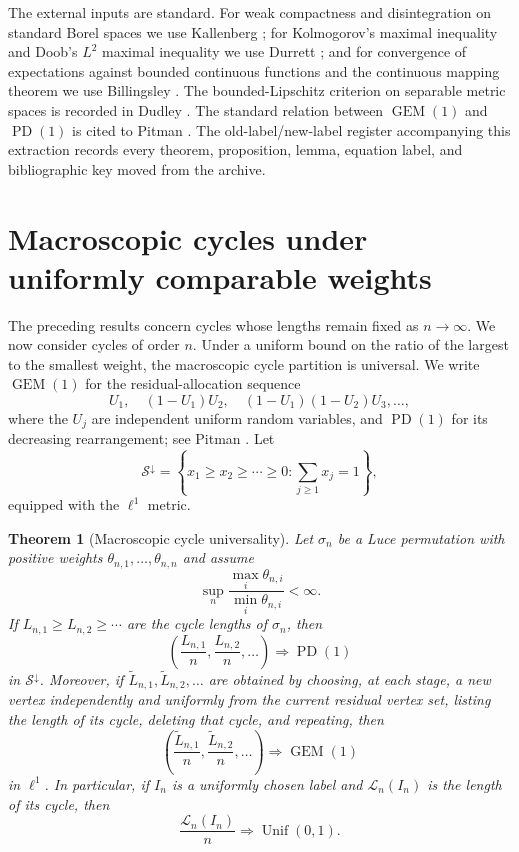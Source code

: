 \documentclass[11pt]{article}
\newtheorem{theorem}{Theorem}[section]
\theoremstyle{remark}
\begin{document}
The external inputs are standard.  For weak compactness and disintegration on
standard Borel spaces we use Kallenberg \cite[Chapters~4 and~6]{Kallenberg2002};
for Kolmogorov's maximal inequality and Doob's $L^2$ maximal inequality we use
Durrett \cite[Chapters~2 and~4]{Durrett2019}; and for convergence of
expectations against bounded continuous functions and the continuous mapping
theorem we use Billingsley \cite[Theorems~2.1 and~2.7]{Billingsley1999}.  The
bounded-Lipschitz criterion on separable metric spaces is recorded in Dudley
\cite[Section~11.3]{Dudley2002}.  The standard relation between
$\operatorname{GEM}(1)$ and $\operatorname{PD}(1)$ is cited to Pitman
\cite[Chapter~3]{Pitman2006}.  The old-label/new-label register accompanying
this extraction records every theorem, proposition, lemma, equation label, and
bibliographic key moved from the archive.

\section{Macroscopic cycles under uniformly comparable weights}
\label{sec:macroscopic-cycles}

The preceding results concern cycles whose lengths remain fixed as $n\to\infty$.
We now consider cycles of order $n$.  Under a uniform bound on the ratio of the
largest to the smallest weight, the macroscopic cycle partition is universal.
We write $\operatorname{GEM}(1)$ for the residual-allocation sequence
\[
 U_1,\quad (1-U_1)U_2,\quad
 (1-U_1)(1-U_2)U_3,\ldots,
\]
where the $U_j$ are independent uniform random variables, and
$\operatorname{PD}(1)$ for its decreasing rearrangement; see
Pitman \cite[Chapter~3]{Pitman2006}.  Let
\[
 \mathcal S^\downarrow
 =\left\{x_1\ge x_2\ge\cdots\ge0:
 \sum_{j\ge1}x_j=1\right\},
\]
equipped with the $\ell^1$ metric.

\begin{theorem}[Macroscopic cycle universality]
\label{thm:macroscopic-pd}
Let $\sigma_n$ be a Luce permutation with positive weights
$\theta_{n,1},\ldots,\theta_{n,n}$ and assume
\[
 \sup_n\frac{\max_i\theta_{n,i}}{\min_i\theta_{n,i}}<\infty.
\]
If $L_{n,1}\ge L_{n,2}\ge\cdots$ are the cycle lengths of $\sigma_n$, then
\[
 \left(\frac{L_{n,1}}n,\frac{L_{n,2}}n,\ldots\right)
 \Rightarrow\operatorname{PD}(1)
\]
in $\mathcal S^\downarrow$.  Moreover, if
$\widetilde L_{n,1},\widetilde L_{n,2},\ldots$ are obtained by choosing, at
each stage, a new vertex independently and uniformly from the current residual
vertex set, listing the length of its cycle, deleting that cycle, and
repeating, then
\[
 \left(\frac{\widetilde L_{n,1}}n,
 \frac{\widetilde L_{n,2}}n,\ldots\right)
 \Rightarrow\operatorname{GEM}(1)
\]
in $\ell^1$.  In particular, if $I_n$ is a uniformly chosen label and
$\mathscr L_n(I_n)$ is the length of its cycle, then
\[
        \frac{\mathscr L_n(I_n)}n\Rightarrow\operatorname{Unif}(0,1).
\]
\end{theorem}
\end{document}
